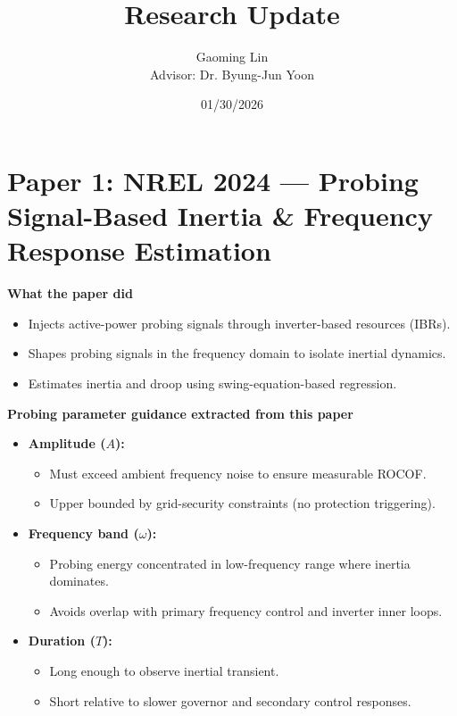 \documentclass[12pt]{article}
\title{\Large Research Update}
\author{Gaoming Lin \\
\vspace{10pt} Advisor: Dr. Byung-Jun Yoon}
\date{01/30/2026}
\begin{document}
\maketitle
\thispagestyle{firstpage}


\newpage
\section*{Paper 1: NREL 2024 — Probing Signal-Based Inertia \& Frequency Response Estimation \cite{peng2024nrel}}

\textbf{What the paper did}
\begin{itemize}
  \item Injects active-power probing signals through inverter-based resources (IBRs).
  \item Shapes probing signals in the frequency domain to isolate inertial dynamics.
  \item Estimates inertia and droop using swing-equation-based regression.
\end{itemize}

\textbf{Probing parameter guidance extracted from this paper}
\begin{itemize}
  \item \textbf{Amplitude ($A$):}
  \begin{itemize}
    \item Must exceed ambient frequency noise to ensure measurable ROCOF.
    \item Upper bounded by grid-security constraints (no protection triggering).
  \end{itemize}

  \item \textbf{Frequency band ($\omega$):}
  \begin{itemize}
    \item Probing energy concentrated in low-frequency range where inertia dominates.
    \item Avoids overlap with primary frequency control and inverter inner loops.
  \end{itemize}

  \item \textbf{Duration ($T$):}
  \begin{itemize}
    \item Long enough to observe inertial transient.
    \item Short relative to slower governor and secondary control responses.
  \end{itemize}
\end{itemize}
\end{document}
